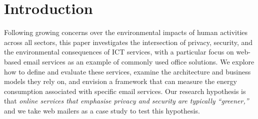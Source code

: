 \documentclass[sigconf,9pt,usenames,dvipsnames,table]{acmart}
\begin{document}
\section{Introduction}

Following growing concerns over the environmental impacts of human
activities across all sectors, this paper investigates the intersection of
privacy, security, and the environmental consequences of ICT services, with
a particular focus on web-based email services as an example of commonly
used
office solutions. We explore how to define and evaluate
these services, examine the architecture and business models they rely on,
and envision a framework that can measure the energy consumption associated
with specific email services. Our research hypothesis is that \emph{online
  services that emphasise privacy and security are typically
  \enquote{greener,}} and
we take web mailers as a case study to test this hypothesis.
\end{document}
